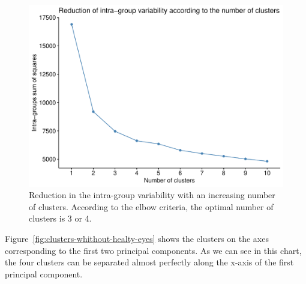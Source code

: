 \documentclass[jcm,article,submit,moreauthors,pdftex]{Definitions/mdpi}
\begin{document}
\begin{figure}[ht]
\centering
\includegraphics[width=0.5\linewidth]{img/reduction-variability-clusters.pdf}
\caption{Reduction in the intra-group variability with an increasing number of clusters. According to the elbow criteria, the optimal number of clusters is 3 or 4.}
\label{fig:reduction-variability-clusters}
\end{figure}

Figure~\ref{fig:clusters-whithout-healty-eyes} shows the clusters on the axes corresponding to the first two principal components. As we can see in this chart, the four clusters can be separated almost perfectly along the x-axis of the first principal component.
\end{document}
